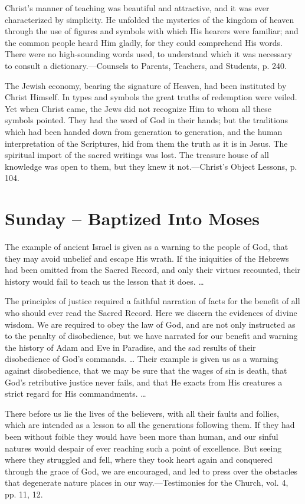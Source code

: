 \documentclass[a4paper, 10pt, twoside, headings=small]{scrartcl}
\begin{document}
\begin{multicols}{2}
Christ’s manner of teaching was beautiful and attractive, and it was ever characterized by simplicity. He unfolded the mysteries of the kingdom of heaven through the use of figures and symbols with which His hearers were familiar; and the common people heard Him gladly, for they could comprehend His words. There were no high-sounding words used, to understand which it was necessary to consult a dictionary.—Counsels to Parents, Teachers, and Students, p. 240.

The Jewish economy, bearing the signature of Heaven, had been instituted by Christ Himself. In types and symbols the great truths of redemption were veiled. Yet when Christ came, the Jews did not recognize Him to whom all these symbols pointed. They had the word of God in their hands; but the traditions which had been handed down from generation to generation, and the human interpretation of the Scriptures, hid from them the truth as it is in Jesus. The spiritual import of the sacred writings was lost. The treasure house of all knowledge was open to them, but they knew it not.—Christ’s Object Lessons, p. 104.

\section*{Sunday – Baptized Into Moses}

The example of ancient Israel is given as a warning to the people of God, that they may avoid unbelief and escape His wrath. If the iniquities of the Hebrews had been omitted from the Sacred Record, and only their virtues recounted, their history would fail to teach us the lesson that it does. …

The principles of justice required a faithful narration of facts for the benefit of all who should ever read the Sacred Record. Here we discern the evidences of divine wisdom. We are required to obey the law of God, and are not only instructed as to the penalty of disobedience, but we have narrated for our benefit and warning the history of Adam and Eve in Paradise, and the sad results of their disobedience of God’s commands. … Their example is given us as a warning against disobedience, that we may be sure that the wages of sin is death, that God’s retributive justice never fails, and that He exacts from His creatures a strict regard for His commandments. …

There before us lie the lives of the believers, with all their faults and follies, which are intended as a lesson to all the generations following them. If they had been without foible they would have been more than human, and our sinful natures would despair of ever reaching such a point of excellence. But seeing where they struggled and fell, where they took heart again and conquered through the grace of God, we are encouraged, and led to press over the obstacles that degenerate nature places in our way.—Testimonies for the Church, vol. 4, pp. 11, 12.


\end{multicols}
\end{document}
